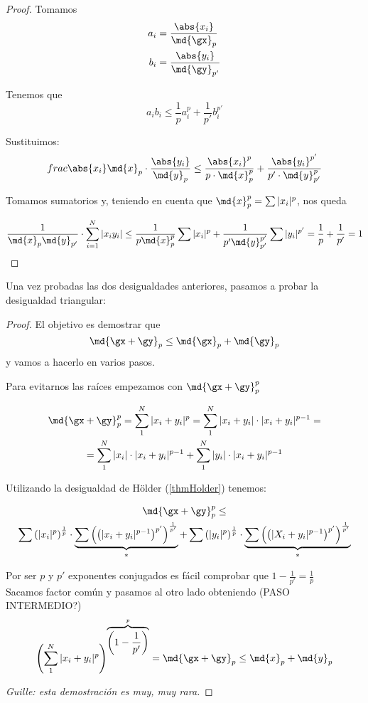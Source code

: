 \documentclass[a4paper,10pt]{apuntes}
\begin{document}
\begin{proof} Tomamos  
 \begin{align*}
 a_i &= \frac{\abs{x_i}}{\md{\gx}_p} \\
 b_i &= \frac{\abs{y_i}}{\md{\gy}_{p'}}
 \end{align*}
 
 Tenemos que \[ a_i b_i \leq \frac{1}{p}a_i ^ p + \frac{1}{p'} b_i^{p'} \]
 
 Sustituimos: 
 \[  frac{\abs{x_i}}{\md{x}_{p}} \cdot \frac{\abs{y_i}}{\md{y}_{p}} \leq \frac{\abs{x_i}^p}{p\cdot \md{x}_{p}^p} + \frac{\abs{y_i}^{p'}}{p'\cdot\md{y}_{p'}^{p}} \]
 
 Tomamos sumatorios y, teniendo en cuenta que $\md{x}_{p}^p = \sum|x_i|^p$, nos queda 
 
 \[ \frac{1}{\md{x}_{p}\md{y}_{p'}}\cdot \sum_{i=1}^N |x_iy_i| \leq \frac{1}{p\md{x}_{p}^p} \sum |x_i|^p + \frac{1}{p'\md{y}_{p'}^{p'}} \sum |y_i|^{p'} = \frac{1}{p} + \frac{1}{p'} = 1 \]
 
 \end{proof}
 
Una vez probadas las dos desigualdades anteriores, pasamos a probar la desigualdad triangular: 
 
\begin{proof} El objetivo es demostrar que \[ \md{\gx+\gy}_p \leq \md{\gx}_p+\md{\gy}_p \] y vamos a hacerlo en varios pasos.
 
 Para evitarnos las raíces empezamos con $\md{\gx+\gy}_p^p$

 \begin{gather*}
 \md{\gx+\gy}_p ^ p = \sum_1 ^ N |x_i+y_i| ^ p = \sum_ 1 ^ N |x_i+y_i| \cdot |x_i+y_i| ^ {p-1} =\\
 = \sum_1 ^ N |x_i|\cdot|x_i+y_i| ^ {p-1} + \sum_1^N |y_i| \cdot |x_i+y_i|^{p-1}
 \end{gather*}

 Utilizando la desigualdad de Hölder (\ref{thmHolder}) tenemos:
 
 \begin{multline*} \md{\gx+\gy}_p ^ p \leq \\
 \sum \left(|x_i|^p\right)^{\frac{1}{p}} \cdot \underbrace{\sum \left(\left(|x_i+y_i|^{p-1}\right)^{p'}\right)^{\frac{1}{p'}}}_* +
 \sum \left(|y_i|^p\right)^{\frac{1}{p}} \cdot \underbrace{\sum \left(\left(|X_i+y_i|^{p-1}\right)^{p'}\right)^{\frac{1}{p'}}}_* 
 \end{multline*}
 
 Por ser $p$ y $p'$ exponentes conjugados es fácil comprobar que $1-\frac{1}{p'} = \frac{1}{p}$\\
 Sacamos factor común y pasamos al otro lado obteniendo (PASO INTERMEDIO?)
\[ \left(\sum_1^N |x_i+y_i|^p\right)^{\overbrace{\left(1-\frac{1}{p'}\right)}^p} = \md{\gx+\gy}_p \leq \md{x}_{p} + \md{y}_{p} \]

\textit{Guille: esta demostración es muy, muy rara.}
\end{proof}
\end{document}
